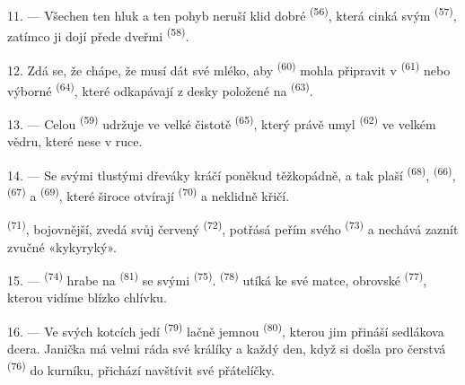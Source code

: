 11. --- Všechen ten hluk a ten pohyb neruší klid dobré 
\textsuperscript{(56)}, která cinká svým  \textsuperscript{(57)},
zatímco ji dojí přede dveřmi  \textsuperscript{(58)}.

12. Zdá se, že chápe, že musí dát své mléko, aby 
\textsuperscript{(60)} mohla připravit  v 
\textsuperscript{(61)} nebo výborné  \textsuperscript{(64)}, které
odkapávají z desky položené na  \textsuperscript{(63)}.

13. --- Celou  \textsuperscript{(59)} udržuje ve velké čistotě
 \textsuperscript{(65)}, který právě umyl 
\textsuperscript{(62)} ve velkém vědru, které nese v ruce.

\VUsaut{3.0mm}
\VUsaut{3.0mm}

14. --- Se svými tlustými dřeváky kráčí poněkud těžkopádně, a tak plaší
 \textsuperscript{(68)},  \textsuperscript{(66)},
 \textsuperscript{(67)} a  \textsuperscript{(69)}, které
široce otvírají  \textsuperscript{(70)} a neklidně křičí.

 \textsuperscript{(71)}, bojovnější, zvedá svůj červený 
\textsuperscript{(72)}, potřásá peřím svého  \textsuperscript{(73)} a
nechává zaznít zvučné «kykyryký».

15. ---  \textsuperscript{(74)} hrabe na 
\textsuperscript{(81)} se svými  \textsuperscript{(75)}.
 \textsuperscript{(78)} utíká ke své matce, obrovské 
\textsuperscript{(77)}, kterou vidíme blízko chlívku.

16. --- Ve svých kotcích jedí  \textsuperscript{(79)} lačně jemnou
 \textsuperscript{(80)}, kterou jim přináší sedlákova dcera. Janička má
velmi ráda své králíky a každý den, když si došla pro čerstvá 
\textsuperscript{(76)} do kurníku, přichází navštívit své přátelíčky.
